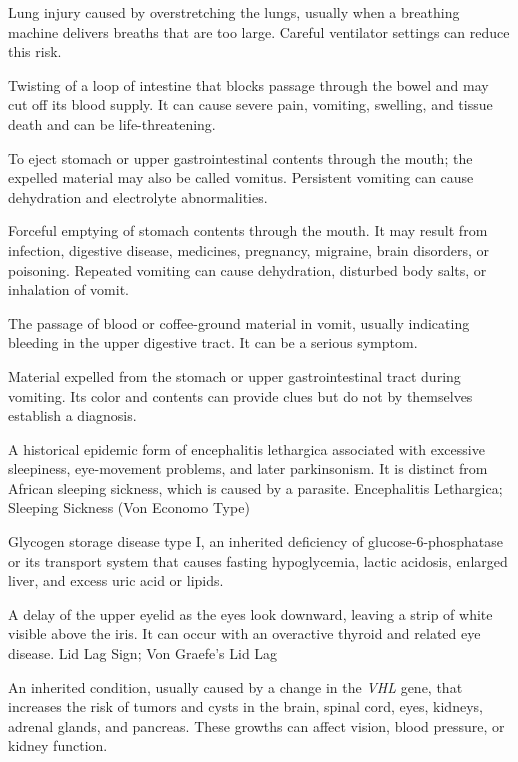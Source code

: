 Lung injury caused by overstretching the lungs, usually when a breathing machine delivers breaths that are too large. Careful ventilator settings can reduce this risk.

 Twisting of a loop of intestine that blocks passage through the bowel and may cut off its blood supply. It can cause severe pain, vomiting, swelling, and tissue death and can be life-threatening.

 To eject stomach or upper gastrointestinal contents through the mouth; the expelled material may also be called vomitus. Persistent vomiting can cause dehydration and electrolyte abnormalities.

 Forceful emptying of stomach contents through the mouth. It may result from infection, digestive disease, medicines, pregnancy, migraine, brain disorders, or poisoning. Repeated vomiting can cause dehydration, disturbed body salts, or inhalation of vomit.

 The passage of blood or coffee-ground material in vomit, usually indicating bleeding in the upper digestive tract. It can be a serious symptom.

 Material expelled from the stomach or upper gastrointestinal tract during vomiting. Its color and contents can provide clues but do not by themselves establish a diagnosis.

 A historical epidemic form of encephalitis lethargica associated with excessive sleepiness, eye-movement problems, and later parkinsonism. It is distinct from African sleeping sickness, which is caused by a parasite.
\synonyms
Encephalitis Lethargica; Sleeping Sickness (Von Economo Type)

 Glycogen storage disease type I, an inherited deficiency of glucose-6-phosphatase or its transport system that causes fasting hypoglycemia, lactic acidosis, enlarged liver, and excess uric acid or lipids.

 A delay of the upper eyelid as the eyes look downward, leaving a strip of white visible above the iris. It can occur with an overactive thyroid and related eye disease.
\synonyms
Lid Lag Sign; Von Graefe's Lid Lag

 An inherited condition, usually caused by a change in the \textit{VHL} gene, that increases the risk of tumors and cysts in the brain, spinal cord, eyes, kidneys, adrenal glands, and pancreas. These growths can affect vision, blood pressure, or kidney function.

